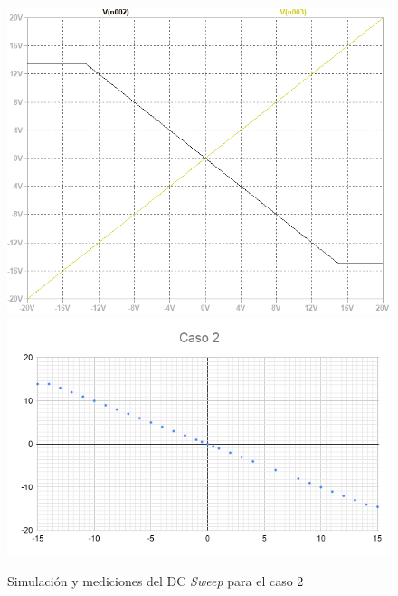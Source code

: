 \begin{figure}[H]
\begin{centering}
\includegraphics[scale=0.4]{../Ex1/iA/Resources1a/dcswp2sim}\includegraphics[scale=0.4]{../Ex1/iA/Resources1a/DCSWEEP2MED}
\par\end{centering}
\caption{Simulación y mediciones del DC \emph{Sweep} para el caso 2}
\label{1_a_40}

\end{figure}

